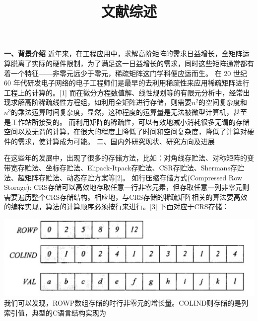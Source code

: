 \documentclass{article}
\begin{document}
  

\title{文献综述}
\date{}

\maketitle


\textbf{一、背景介绍}
      \qquad
\newline
      \qquad
      近年来，在工程应用中，求解高阶矩阵的需求日益增长，全矩阵运算脱离了实际的硬件限制，为了满足这一日益增长的需求，同时这些矩阵通常都有着一个特征——非零元远少于零元，稀疏矩阵这门学科便应运而生。
在 20 世纪 60 年代研发电子网络的电子工程师们是最早的去利用稀疏性来应用稀疏矩阵进行工程上的计算的。[1]
而在微分方程数值解、线性规划等的有限元分析中，经常出现求解高阶稀疏线性方程组，如利用全矩阵进行存储，则需要$n^2$的空间复杂度和$n^3$的乘法运算时间复杂度，显然，这种程度的运算量是无法被微型计算机，甚至是工作站所接受的。
而利用矩阵的稀疏性，可以有效地减小消耗很多无谓的存储空间以及无谓的计算，在很大的程度上降低了时间和空间复杂度，降低了计算对硬件的需求，使计算成为可能。
\newline
二、国内外研究现状、研究方向及进展\newline

在这些年的发展中，出现了很多的存储方法，比如：对角线存贮法、对称矩阵的变带宽存贮法、坐标存贮法、Elipack-Itpack存贮法、CSR存贮法、Shermans存贮法、超矩阵存贮法、动态存贮方案等[2]。
\newline
如行压缩存储方式(Compressed Row Storage):
CRS存储可以高效地存取任意一行非零元素，但存取任意一列非零元则需要遍历整个CRS存储结构。相应地，与CRS存储的稀疏矩阵相关的算法要高效的编程实现，算法的计算顺序必须按行来进行。[3]
下面对应于CRS存储：
\newline\newline\newline\newline\newline\newline\newline

\includegraphics[scale=0.25]{crs.png}
我们可以发现，ROWP数组存储的时行非零元的增长量。COLIND则存储的是列索引值，典型的C语言结构实现为\newline
\end{document}
